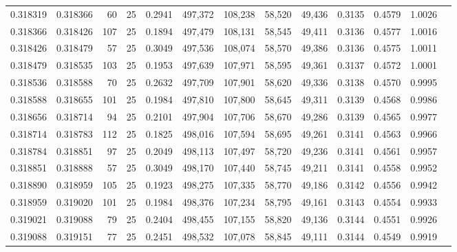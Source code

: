 \begin{tabular}{rrrrrrrrrrrrr}
0.318319 & 0.318366 &    60 &  25 &                                     0.2941 & 497,372 & 108,238 &  58,520 &  49,436 & 0.3135 & 0.4579 & 1.0026 \\
0.318366 & 0.318426 &   107 &  25 &                                     0.1894 & 497,479 & 108,131 &  58,545 &  49,411 & 0.3136 & 0.4577 & 1.0016 \\
0.318426 & 0.318479 &    57 &  25 &                                     0.3049 & 497,536 & 108,074 &  58,570 &  49,386 & 0.3136 & 0.4575 & 1.0011 \\
0.318479 & 0.318535 &   103 &  25 &                                     0.1953 & 497,639 & 107,971 &  58,595 &  49,361 & 0.3137 & 0.4572 & 1.0001 \\
0.318536 & 0.318588 &    70 &  25 &                                     0.2632 & 497,709 & 107,901 &  58,620 &  49,336 & 0.3138 & 0.4570 & 0.9995 \\
0.318588 & 0.318655 &   101 &  25 &                                     0.1984 & 497,810 & 107,800 &  58,645 &  49,311 & 0.3139 & 0.4568 & 0.9986 \\
0.318656 & 0.318714 &    94 &  25 &                                     0.2101 & 497,904 & 107,706 &  58,670 &  49,286 & 0.3139 & 0.4565 & 0.9977 \\
0.318714 & 0.318783 &   112 &  25 &                                     0.1825 & 498,016 & 107,594 &  58,695 &  49,261 & 0.3141 & 0.4563 & 0.9966 \\
0.318784 & 0.318851 &    97 &  25 &                                     0.2049 & 498,113 & 107,497 &  58,720 &  49,236 & 0.3141 & 0.4561 & 0.9957 \\
0.318851 & 0.318888 &    57 &  25 &                                     0.3049 & 498,170 & 107,440 &  58,745 &  49,211 & 0.3141 & 0.4558 & 0.9952 \\
0.318890 & 0.318959 &   105 &  25 &                                     0.1923 & 498,275 & 107,335 &  58,770 &  49,186 & 0.3142 & 0.4556 & 0.9942 \\
0.318959 & 0.319020 &   101 &  25 &                                     0.1984 & 498,376 & 107,234 &  58,795 &  49,161 & 0.3143 & 0.4554 & 0.9933 \\
0.319021 & 0.319088 &    79 &  25 &                                     0.2404 & 498,455 & 107,155 &  58,820 &  49,136 & 0.3144 & 0.4551 & 0.9926 \\
0.319088 & 0.319151 &    77 &  25 &                                     0.2451 & 498,532 & 107,078 &  58,845 &  49,111 & 0.3144 & 0.4549 & 0.9919 \\

\end{tabular}
